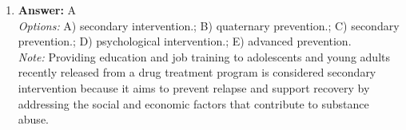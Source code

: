 \documentclass[12pt]{article}
\begin{document}
\begin{enumerate}[label=\arabic*.]
\\ \textit{Note:} The correct answer represents the sequence of neuronal communication in a reflex arc, where the afferent neuron conveys sensory information to the interneuron in the spinal cord, which then relays the impulse to the efferent neuron that activates the effector, thereby facilitating a quick, involuntary response to a stimulus.
\item \textbf{Answer:} A
\\ \textit{Options:} A) secondary intervention.; B) quaternary prevention.; C) secondary prevention.; D) psychological intervention.; E) advanced prevention.
\\ \textit{Note:} Providing education and job training to adolescents and young adults recently released from a drug treatment program is considered secondary intervention because it aims to prevent relapse and support recovery by addressing the social and economic factors that contribute to substance abuse.
\end{enumerate}
\end{document}
